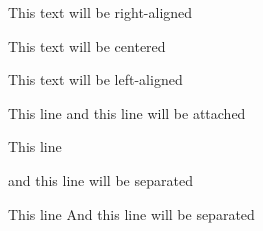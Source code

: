 \documentclass[a4paper]{article}
\begin{document}


\begin{flushright}
This text will be right-aligned
\end{flushright}

\begin{center}
This text will be centered
\end{center}

\begin{flushleft}
This text will be left-aligned
\end{flushleft}

This line
and this line will be attached

This line

and this line will be separated

This line \newline
And this line will be separated
\end{document}
